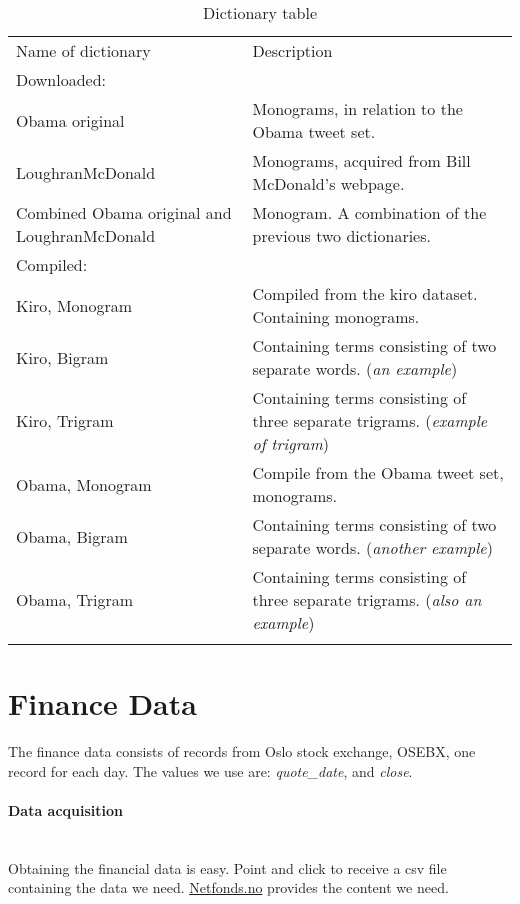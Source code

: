 \begin{table}
\centering
\label{tbl:dictionaries}
\caption{Dictionary table}
\begin{tabular}{ p{5cm} p{7cm} }
Name of dictionary & Description \\
Downloaded:& \\
\hline
Obama original & Monograms, in relation to the Obama tweet set. \\
LoughranMcDonald & Monograms, acquired from Bill McDonald's webpage.\\
Combined Obama original and LoughranMcDonald & Monogram. A combination of
the previous two dictionaries. \\

Compiled:& \\
\hline
Kiro, Monogram & Compiled from the kiro dataset. Containing
monograms. \\
Kiro, Bigram &  Containing terms consisting of two separate words. (\textit{an 
example}) \\
Kiro, Trigram & Containing terms consisting of three separate trigrams.
(\textit{example of trigram})\\
Obama, Monogram & Compile from the Obama tweet set, monograms. \\
Obama, Bigram & Containing terms consisting of two separate words.
(\textit{another example}) \\
Obama, Trigram & Containing terms consisting of three separate trigrams.
(\textit{also an example})\\

	\label{data:dictionary_list}
\end{tabular}
\end{table}
%

\section{Finance Data}\label{data:finance}
The finance data consists of records from Oslo stock exchange, OSEBX, one
record for each day. 
The values we use are: \textit{quote\_date}, and \textit{close}.

\paragraph{Data acquisition}
\hspace{0pt}\\
Obtaining the financial data is easy. Point and click to receive a csv file
containing the data we need. \url{Netfonds.no} provides the content we need.

